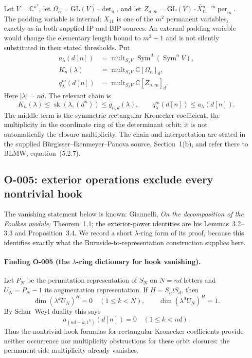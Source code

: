 Let $V=\mathbb C^{n^2}$, let
$\Omega_n=\overline{\mathrm{GL}(V)\cdot\det_n}$, and let
$Z_{n,m}=\overline{\mathrm{GL}(V)\cdot X_{11}^{n-m}\operatorname{per}_m}$.
The padding variable is internal: $X_{11}$ is one of the $m^2$
permanent variables, exactly as in both supplied IP and BIP sources.
An external padding variable would change the elementary length
bound to $m^2+1$ and is not silently substituted in their stated
thresholds. Put
\[
\begin{split}
 a_\lambda(d[n])&=\operatorname{mult}_{S_\lambda V}
                         \operatorname{Sym}^d(\operatorname{Sym}^nV),\\
 K_n(\lambda)&=\operatorname{mult}_{S_\lambda V}
                         \mathbb C[\Omega_n]_d,\\
 q^m_\lambda(d[n])&=\operatorname{mult}_{S_\lambda V}
                         \mathbb C[Z_{n,m}]_d.
\end{split}
\]
Here $|\lambda|=nd$.  The relevant chain is
\[
 K_n(\lambda)\leq\operatorname{sk}(\lambda,(d^n))
                  \leq g_{n,d}(\lambda),\qquad
 q^m_\lambda(d[n])\leq a_\lambda(d[n]).                    \tag{O-005.0}
\]
The middle term is the symmetric rectangular Kronecker coefficient,
the multiplicity in the coordinate ring of the determinant orbit;
it is not automatically the closure multiplicity. The chain and
interpretation are stated in the supplied B\"urgisser--Ikenmeyer--Panova
source, Section~1(b), and refer there to BLMW, equation~(5.2.7).

\subsection{O-005: exterior operations exclude every nontrivial hook}

The vanishing statement below is known: Giannelli,
\emph{On the decomposition of the Foulkes module}, Theorem~1.1;
the exterior-power identities are his Lemmas~3.2--3.3 and
Proposition~3.4. We record a short $\lambda$-ring form of its proof,
because this identifies exactly what the Burnside-to-representation
construction supplies here.

\paragraph{Finding O-005 (the $\lambda$-ring dictionary for hook vanishing).}
Let $P_N$ be the permutation representation of $S_N$ on $N=nd$
letters and $U_N=P_N-1$ its augmentation representation. If
$H=S_n\wr S_d$, then
\[
       \dim(\lambda^k U_N)^H=0\quad(1\leq k<N),
       \qquad \dim(\lambda^0 U_N)^H=1.                  \tag{O-005.1}
\]
By Schur--Weyl duality this says
\[
               a_{(nd-k,1^k)}(d[n])=0\quad(1\leq k<nd).
\]
Thus the nontrivial hook formulas for rectangular Kronecker coefficients
provide neither occurrence nor multiplicity obstructions for these
orbit closures: the permanent-side multiplicity already vanishes.

